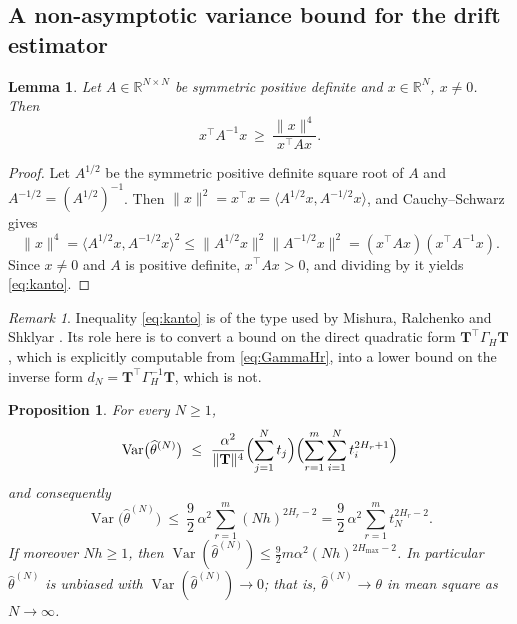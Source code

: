\documentclass[11pt,reqno]{amsart}
\numberwithin{equation}{section}
\theoremstyle{plain}
\newtheorem{proposition}[theorem]{Proposition}
\newtheorem{lemma}[theorem]{Lemma}
\theoremstyle{definition}
\theoremstyle{remark}
\newtheorem{remark}[theorem]{Remark}
\newcommand{\bT}{\mathbf{T}}
\newcommand{\GH}{\Gamma_H}
\newcommand{\Hmax}{H_{\max}}
\newcommand{\R}{\mathbb{R}}
\DeclareMathOperator{\Var}{Var}
\begin{document}
\subsection{A non-asymptotic variance bound for the drift estimator}

\begin{lemma}\label{le:kanto}
Let $A\in\R^{N\times N}$ be symmetric positive definite and $x\in\R^{N}$, $x\ne0$. Then
\begin{equation}\label{eq:kanto}
  x^{\top}A^{-1}x\ \ge\ \frac{\|x\|^{4}}{x^{\top}Ax}.
\end{equation}
\end{lemma}

\begin{proof}
Let $A^{1/2}$ be the symmetric positive definite square root of $A$ and
$A^{-1/2}=(A^{1/2})^{-1}$. Then
$\|x\|^{2}=x^{\top}x=\langle A^{1/2}x,A^{-1/2}x\rangle$, and Cauchy--Schwarz gives
\[
  \|x\|^{4}=\langle A^{1/2}x,A^{-1/2}x\rangle^{2}
  \le\|A^{1/2}x\|^{2}\|A^{-1/2}x\|^{2}=(x^{\top}Ax)(x^{\top}A^{-1}x).
\]
Since $x\ne0$ and $A$ is positive definite, $x^{\top}Ax>0$, and dividing by it yields
\eqref{eq:kanto}.
\end{proof}

\begin{remark}\label{re:kantorole}
Inequality \eqref{eq:kanto} is of the type used by Mishura, Ralchenko and Shklyar
\cite[Sec.~2]{MRS17}. Its role here is to convert a bound on the direct quadratic form
$\bT^{\top}\GH\bT$, which is explicitly computable from \eqref{eq:GammaHr}, into a lower
bound on the inverse form $d_N=\bT^{\top}\GH^{-1}\bT$, which is not.
\end{remark}

\begin{proposition}\label{pr:varbound}
For every $N\ge1$,
\begin{equation}\label{eq:varbound-sharp}
  \Var\bigl(\widehat\theta^{(N)}\bigr)\ \le\
  \frac{\alpha^{2}}{\|\bT\|^{4}}
  \Bigl(\sum_{j=1}^{N}t_j\Bigr)
  \Bigl(\sum_{r=1}^{m}\sum_{i=1}^{N}t_i^{2H_r+1}\Bigr)
\end{equation}
and consequently
\begin{equation}\label{eq:varbound}
  \Var\bigl(\widehat\theta^{(N)}\bigr)\ \le\
  \frac92\,\alpha^{2}\sum_{r=1}^{m}(Nh)^{2H_r-2}
  =\frac92\,\alpha^{2}\sum_{r=1}^{m}t_N^{2H_r-2}.
\end{equation}
If moreover $Nh\ge1$, then
$\Var(\widehat\theta^{(N)})\le\frac92m\alpha^{2}(Nh)^{2\Hmax-2}$. In particular
$\widehat\theta^{(N)}$ is unbiased with $\Var(\widehat\theta^{(N)})\to0$; that is,
$\widehat\theta^{(N)}\to\theta$ in mean square as $N\to\infty$.
\end{proposition}
\end{document}
